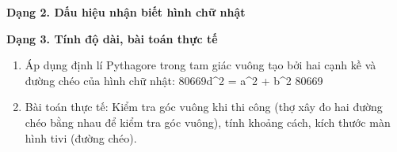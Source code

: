 \textbf{Dạng 2. Dấu hiệu nhận biết hình chữ nhật}

\textbf{Dạng 3. Tính độ dài, bài toán thực tế}
\begin{enumerate}
\item Áp dụng định lí Pythagore trong tam giác vuông tạo bởi hai cạnh kề và đường chéo của hình chữ nhật:
80669d^2 = a^2 + b^2 \implies {}80669
\item Bài toán thực tế: Kiểm tra góc vuông khi thi công (thợ xây đo hai đường chéo bằng nhau để kiểm tra góc vuông), tính khoảng cách, kích thước màn hình tivi (đường chéo).
\end{enumerate}
